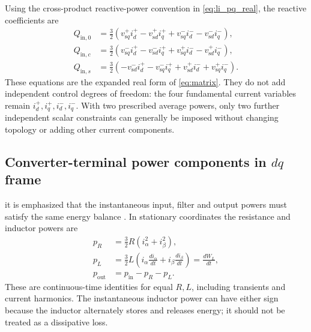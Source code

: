 Using the cross-product reactive-power convention in \eqref{eq:li_pq_real}, the reactive coefficients are
\begin{equation}\label{eq:li_grid_Q_real}
\begin{aligned}
Q_{\mathrm{in},0}&=\frac32(v_{\mathrm{s}q}^+i_d^+-v_{\mathrm{s}d}^+i_q^+
                  +v_{\mathrm{s}q}^-i_d^--v_{\mathrm{s}d}^-i_q^-),\\
Q_{\mathrm{in},c}&=\frac32(v_{\mathrm{s}q}^-i_d^+-v_{\mathrm{s}d}^-i_q^+
                  +v_{\mathrm{s}q}^+i_d^--v_{\mathrm{s}d}^+i_q^-),\\
Q_{\mathrm{in},s}&=\frac32(-v_{\mathrm{s}d}^-i_d^+-v_{\mathrm{s}q}^-i_q^+
                  +v_{\mathrm{s}d}^+i_d^-+v_{\mathrm{s}q}^+i_q^-).
\end{aligned}
\end{equation}
These equations are the expanded real form of \eqref{eq:matrix}. They do not add independent control degrees of freedom: the four fundamental current variables remain \(i_d^+,i_q^+,i_d^-,i_q^-\). With two prescribed average powers, only two further independent scalar constraints can generally be imposed without changing topology or adding other current components.

\subsection{Converter-terminal power components in \(dq\) frame}
it is emphasized that the instantaneous input, filter and output powers must satisfy the same energy balance \cite{wu2008}. In stationary coordinates the resistance and inductor powers are
\begin{equation}\label{eq:li_wu_filter_ct}
\begin{aligned}
p_R&=\frac32R(i_\alpha^2+i_\beta^2),\\
p_L&=\frac32L\left(i_\alpha\frac{di_\alpha}{dt}
                      +i_\beta\frac{di_\beta}{dt}\right)
     =\frac{dW_L}{dt},\\
p_{\mathrm{out}}&=p_{\mathrm{in}}-p_R-p_L .
\end{aligned}
\end{equation}
These are continuous-time identities for equal \(R,L\), including transients and current harmonics. The instantaneous inductor power can have either sign because the inductor alternately stores and releases energy; it should not be treated as a dissipative loss.


